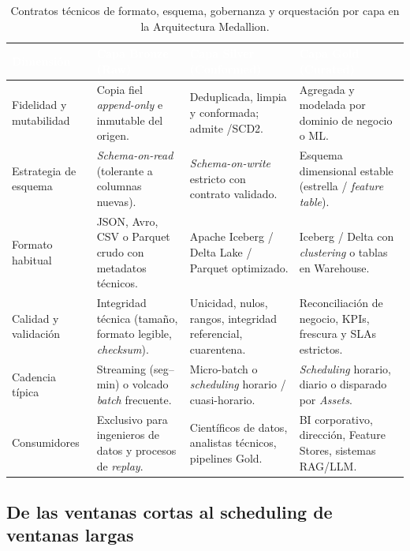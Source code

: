 \begin{table}[htbp]
\centering
\caption{Contratos técnicos de formato, esquema, gobernanza y orquestación por capa en la Arquitectura Medallion.}
\label{tab:contratos-medallion}
\footnotesize
\begin{tabularx}{\textwidth}{@{}L{2.5cm} Y Y Y@{}}
\toprule
{}
\textcolor{white}{\sffamily\bfseries Dimensión} &
\textcolor{white}{\sffamily\bfseries Capa Bronze (Raw)} &
\textcolor{white}{\sffamily\bfseries Capa Silver (Conformed)} &
\textcolor{white}{\sffamily\bfseries Capa Gold (Curated)} \\
\midrule
Fidelidad y mutabilidad & Copia fiel \textit{append-only} e inmutable del origen. & Deduplicada, limpia y conformada; admite /SCD2. & Agregada y modelada por dominio de negocio o ML. \\
Estrategia de esquema & \textit{Schema-on-read} (tolerante a columnas nuevas). & \textit{Schema-on-write} estricto con contrato validado. & Esquema dimensional estable (estrella / \textit{feature table}). \\
Formato habitual & JSON, Avro, CSV o Parquet crudo con metadatos técnicos. & Apache Iceberg / Delta Lake / Parquet optimizado. & Iceberg / Delta con \textit{clustering} o tablas en Warehouse. \\
Calidad y validación & Integridad técnica (tamaño, formato legible, \textit{checksum}). & Unicidad, nulos, rangos, integridad referencial, cuarentena. & Reconciliación de negocio, KPIs, frescura y SLAs estrictos. \\
Cadencia típica & Streaming (seg--min) o volcado \textit{batch} frecuente. & Micro-batch o \textit{scheduling} horario / cuasi-horario. & \textit{Scheduling} horario, diario o disparado por \textit{Assets}. \\
Consumidores & Exclusivo para ingenieros de datos y procesos de \textit{replay}. & Científicos de datos, analistas técnicos, pipelines Gold. & BI corporativo, dirección, Feature Stores, sistemas RAG/LLM. \\
\bottomrule
\end{tabularx}
\end{table}

\subsection{De las ventanas cortas al scheduling de ventanas largas}\label{subsec:ventanas-scheduling}

